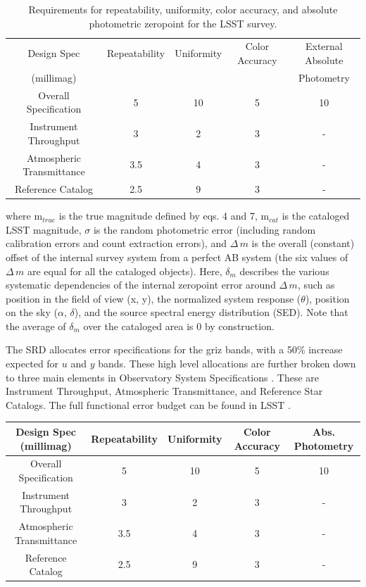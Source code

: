 \documentclass[SE,authoryear,lsstdraft,toc]{lsstdoc}
\newcommand{\deltam}{\delta_m}
\newcommand{\Deltam}{\Delta\,m}
\begin{document}
\begin{table}
\centering
\begin{tabular}{|c|c|c|c|c|}
\hline
Design Spec & Repeatability & Uniformity & Color Accuracy & External Absolute  \\
 (millimag) &  &  &  & Photometry \\
\hline\hline
Overall Specification & 5 &  10 & 5 & 10 \\
Instrument Throughput & 3 & 2 & 3 & -  \\
Atmospheric Transmittance & 3.5 & 4 & 3 & - \\
Reference Catalog & 2.5 & 9 & 3 & - \\
\hline
\end{tabular}
\caption{Requirements for repeatability, uniformity, color accuracy, and
  absolute photometric zeropoint for the LSST survey.}
\label{tab:table1}
\end{table}
%
where $\textrm{m}_{true}$ is the true magnitude defined by eqs. 4 and 7,
$\textrm{m}_{cat}$ is the cataloged LSST magnitude, $\sigma$ is the random
photometric error (including random calibration errors and count extraction
errors), and $\Deltam$ is the overall (constant) offset of the internal survey
system from a perfect AB system (the six values of $\Deltam$ are equal for all
the cataloged objects).  Here, $\deltam$ describes the various systematic
dependencies of the internal zeropoint error around $\Deltam$, such as position
in the field of view (x, y), the normalized system response ($\theta$),
position on the sky ($\alpha$, $\delta$), and the source spectral energy
distribution (SED).  Note that the average of $\deltam$ over the cataloged area
is 0 by construction.

The SRD allocates error specifications for the griz bands, with a 50\% increase
expected for $u$ and $y$ bands.  These high level allocations are further broken
down to three main elements in Observatory System Specifications .
These are Instrument Throughput, Atmospheric Transmittance, and Reference Star
Catalogs.  The full functional error budget can be found in LSST .

\begin{table}
    \begin{tabular}{|c|c|c|c|c|}
        \hline
        Design Spec (millimag) & Repeatability & Uniformity & Color Accuracy & Abs. Photometry \\
        \hline
        \hline
        Overall Specification & 5 & 10 & 5 & 10 \\
        \hline
        Instrument Throughput & 3 & 2 & 3 & - \\
        \hline
        Atmospheric Transmittance & 3.5 & 4 & 3 & - \\
        \hline
        Reference Catalog & 2.5 & 9 & 3 & - \\
        \hline
    \end{tabular}

\end{table}
\end{document}
